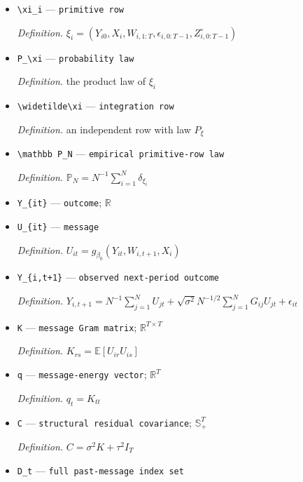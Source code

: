 \documentclass{article}
\begin{document}
\begin{itemize}
  \item \texttt{\textbackslash{}\allowbreak{}xi\_\allowbreak{}i} --- \texttt{primitive row}
  \par\smallskip\noindent\emph{Definition.} \(\xi_i=(Y_{i0},X_i,W_{i,1:T},\epsilon_{i,0:T-1},Z_{i,0:T-1}^{\circ})\)
  \item \texttt{P\_\allowbreak{}\textbackslash{}\allowbreak{}xi} --- \texttt{probability law}
  \par\smallskip\noindent\emph{Definition.} the product law of \(\xi_i\)
  \item \texttt{\textbackslash{}\allowbreak{}widetilde\textbackslash{}\allowbreak{}xi} --- \texttt{integration row}
  \par\smallskip\noindent\emph{Definition.} an independent row with law \(P_\xi\)
  \item \texttt{\textbackslash{}\allowbreak{}mathbb P\_\allowbreak{}N} --- \texttt{empirical primitive-\allowbreak{}row law}
  \par\smallskip\noindent\emph{Definition.} \(\mathbb P_N=N^{-1}\sum_{i=1}^N\delta_{\xi_i}\)
  \item \texttt{Y\_\allowbreak{}\{it\}\allowbreak{}} --- \texttt{outcome}; \(\mathbb R\)
  \item \texttt{U\_\allowbreak{}\{it\}\allowbreak{}} --- \texttt{message}
  \par\smallskip\noindent\emph{Definition.} \(U_{it}=g_{\beta_0}(Y_{it},W_{i,t+1},X_i)\)
  \item \texttt{Y\_\allowbreak{}\{i,\allowbreak{}t+\allowbreak{}1\}\allowbreak{}} --- \texttt{observed next-\allowbreak{}period outcome}
  \par\smallskip\noindent\emph{Definition.} \(Y_{i,t+1}=N^{-1}\sum_{j=1}^NU_{jt}+\sqrt{\sigma^2}N^{-1/2}\sum_{j=1}^NG_{ij}U_{jt}+\epsilon_{it}\)
  \item \texttt{K} --- \texttt{message Gram matrix}; \(\mathbb R^{T\times T}\)
  \par\smallskip\noindent\emph{Definition.} \(K_{rs}=\mathbb E[U_{ir}U_{is}]\)
  \item \texttt{q} --- \texttt{message-\allowbreak{}energy vector}; \(\mathbb R^T\)
  \par\smallskip\noindent\emph{Definition.} \(q_t=K_{tt}\)
  \item \texttt{C} --- \texttt{structural residual covariance}; \(\mathbb S_+^T\)
  \par\smallskip\noindent\emph{Definition.} \(C=\sigma^2K+\tau^2I_T\)
  \item \texttt{D\_\allowbreak{}t} --- \texttt{full past-\allowbreak{}message index set}

\end{itemize}
\end{document}
